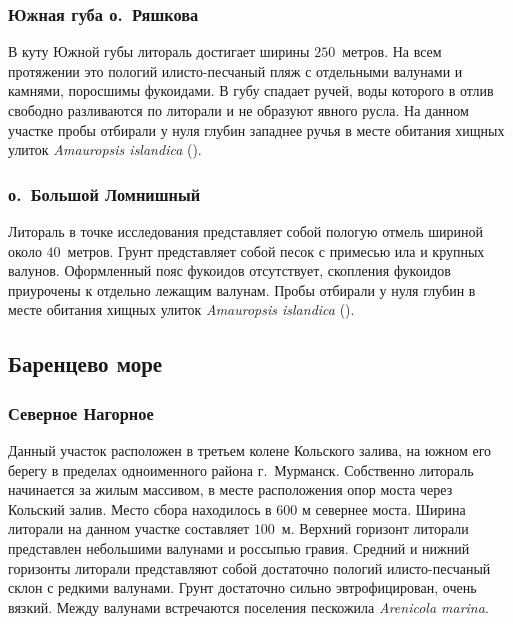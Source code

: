 \subsubsection{Южная губа о.~Ряшкова}
В куту Южной губы литораль достигает ширины $250$~метров. 
На всем протяжении это пологий илисто-песчаный пляж с отдельными валунами и камнями, поросшимы фукоидами.
В губу спадает ручей, воды которого в отлив свободно разливаются по литорали и не образуют явного русла.
На данном участке пробы отбирали у нуля глубин западнее ручья в месте обитания хищных улиток \textit{Amauropsis islandica} (\cite{Aristov_Granovich_2011}).


\subsubsection{о.~Большой Ломнишный}
Литораль в точке исследования представляет собой пологую отмель шириной около $40$~метров.
Грунт представляет собой песок с примесью ила и крупных валунов.
Оформленный пояс фукоидов отсутствует, скопления фукоидов приурочены к отдельно лежащим валунам.
Пробы отбирали у нуля глубин в месте обитания хищных улиток \textit{Amauropsis islandica} (\cite{Aristov_Granovich_2011}).



            \subsection{Баренцево море}

            \subsubsection{Северное Нагорное}
Данный участок расположен в третьем колене Кольского залива, на южном его берегу в пределах одноименного района г.~Мурманск. 
Собственно литораль начинается за жилым массивом, в месте расположения опор моста через Кольский залив. 
Место сбора находилось в 600 м севернее моста. 
Ширина литорали на данном участке составляет $100$~м. 
Верхний горизонт литорали представлен небольшими валунами и россыпью гравия. 
Средний и нижний горизонты литорали представляют собой достаточно пологий илисто-песчаный склон с редкими валунами. 
Грунт достаточно сильно эвтрофицирован, очень вязкий. 
Между валунами встречаются поселения пескожила {\it Arenicola marina}.

